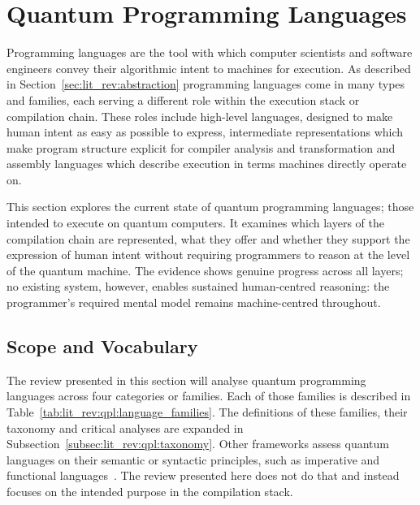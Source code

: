 \section{Quantum Programming Languages}\label{sec:lit_rev:qpl}
Programming languages are the tool with which computer scientists and software engineers convey their algorithmic intent to machines for execution.
As described in Section~\ref{sec:lit_rev:abstraction} programming languages come in many types and families, each serving a different role within the execution stack or compilation chain.
These roles include high-level languages, designed to make human intent as easy as possible to express, intermediate representations which make program structure explicit for compiler analysis and transformation and assembly languages which describe execution in terms machines directly operate on.

This section explores the current state of quantum programming languages; those intended to execute on quantum computers.
It examines which layers of the compilation chain are represented, what they offer and whether they support the expression of human intent without requiring programmers to reason at the level of the quantum machine.
The evidence shows genuine progress across all layers; no existing system, however, enables sustained human-centred reasoning: the programmer's required mental model remains machine-centred throughout.

\subsection{Scope and Vocabulary}\label{subsec:lit_rev:qpl:scope}
The review presented in this section will analyse quantum programming languages across four categories or families.
Each of those families is described in Table~\ref{tab:lit_rev:qpl:language_families}.
The definitions of these families, their taxonomy and critical analyses are expanded in Subsection~\ref{subsec:lit_rev:qpl:taxonomy}.
Other frameworks assess quantum languages on their semantic or syntactic principles, such as imperative and functional languages~\cite{Gay2006QPLSurvey}.
The review presented here does not do that and instead focuses on the intended purpose in the compilation stack.

